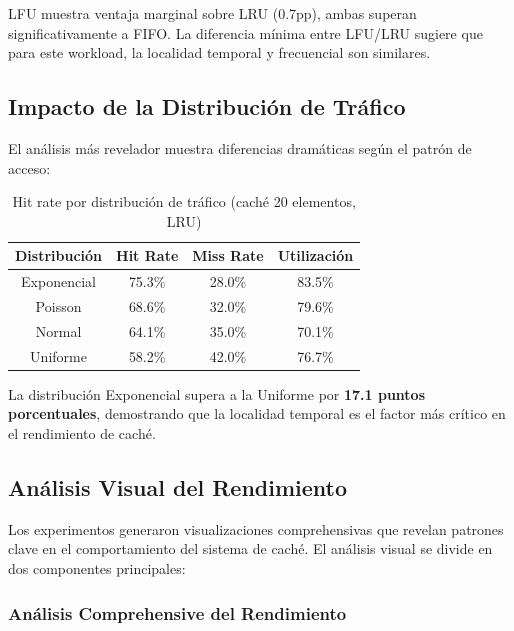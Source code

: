 \documentclass[12pt,a4paper]{article}
\begin{document}
LFU muestra ventaja marginal sobre LRU (0.7pp), ambas superan significativamente a FIFO. La diferencia mínima entre LFU/LRU sugiere que para este workload, la localidad temporal y frecuencial son similares.

\subsection{Impacto de la Distribución de Tráfico}

El análisis más revelador muestra diferencias dramáticas según el patrón de acceso:

\begin{table}[H]
\centering
\caption{Hit rate por distribución de tráfico (caché 20 elementos, LRU)}
\begin{tabular}{|c|c|c|c|}
\hline
\textbf{Distribución} & \textbf{Hit Rate} & \textbf{Miss Rate} & \textbf{Utilización} \\
\hline
Exponencial & 75.3\% & 28.0\% & 83.5\% \\
Poisson & 68.6\% & 32.0\% & 79.6\% \\
Normal & 64.1\% & 35.0\% & 70.1\% \\
Uniforme & 58.2\% & 42.0\% & 76.7\% \\
\hline
\end{tabular}
\end{table}

La distribución Exponencial supera a la Uniforme por \textbf{17.1 puntos porcentuales}, demostrando que la localidad temporal es el factor más crítico en el rendimiento de caché.

\subsection{Análisis Visual del Rendimiento}

Los experimentos generaron visualizaciones comprehensivas que revelan patrones clave en el comportamiento del sistema de caché. El análisis visual se divide en dos componentes principales:

\subsubsection{Análisis Comprehensive del Rendimiento}
\end{document}

